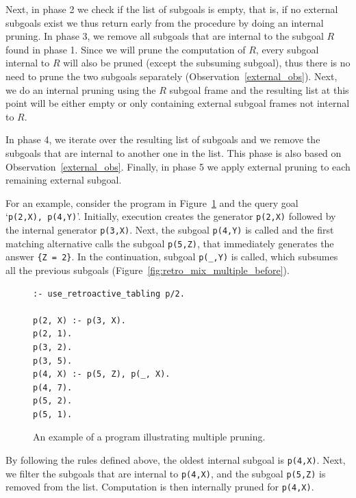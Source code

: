 Next, in phase 2 we check if the list of subgoals is empty, that is, if no external subgoals exist
we thus return early from the procedure by doing an internal pruning.
In phase 3, we remove all subgoals that are internal to the subgoal $R$ found in phase 1.
Since we will prune the computation of $R$, every subgoal internal to $R$ will also be pruned
(except the subsuming subgoal), thus there is no need to prune the two subgoals separately
(Observation~\ref{external_obs}). Next, we do an internal pruning using the $R$ subgoal frame
and the resulting list at this point will be either empty or only containing external subgoal
frames not internal to $R$.

In phase 4, we iterate over the resulting list of subgoals and we remove the subgoals that
are internal to another one in the list. This phase is also based on Observation~\ref{external_obs}.
Finally, in phase 5 we apply external pruning to each remaining external subgoal.

For an example, consider the program in Figure~\ref{fig:retro_mix_program} and the query goal
`\texttt{p(2,X),~p(4,Y)}'. Initially, execution creates the generator \texttt{p(2,X)} followed by the internal
generator \texttt{p(3,X)}. Next, the subgoal \texttt{p(4,Y)} is called and the first matching alternative calls the
subgoal \texttt{p(5,Z)}, that immediately generates the answer \texttt{\{Z~=~2\}}. In the continuation, subgoal
\texttt{p(\_,Y)} is called, which subsumes all the previous subgoals (Figure~\ref{fig:retro_mix_multiple_before}).

\begin{figure}[ht]
\begin{Verbatim}
:- use_retroactive_tabling p/2.

p(2, X) :- p(3, X).
p(2, 1).
p(3, 2).
p(3, 5).
p(4, X) :- p(5, Z), p(_, X).
p(4, 7).
p(5, 2).
p(5, 1).
\end{Verbatim}
\caption{An example of a program illustrating multiple pruning.}
\label{fig:retro_mix_program}
\end{figure}

By following the rules defined above, the oldest internal subgoal is \texttt{p(4,X)}.
Next, we filter the subgoals that are internal to \texttt{p(4,X)}, and the subgoal
\texttt{p(5,Z)} is removed from the list. Computation is then internally pruned for
\texttt{p(4,X)}.

